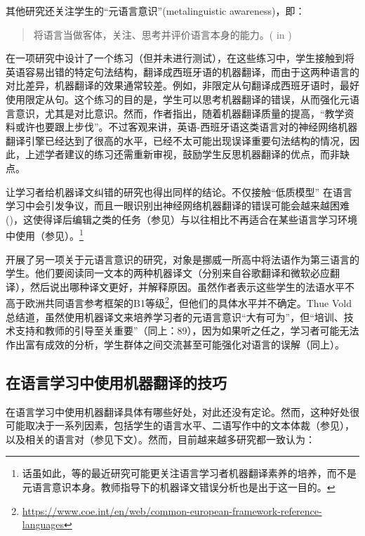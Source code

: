 \documentclass[output=paper,colorlinks,citecolor=brown]{langscibook}
\begin{document}
其他研究还关注学生的“元语言意识”(metalinguistic awareness)，即：

\begin{quote}
 {将语言当做客体，关注、思考并评价语言本身的能力。(\citet[531]{Thomas1988} in \citealt[67]{ThueVold2018})}
\end{quote}

\citet{EnkinMejías-Bikandi2016}在一项研究中设计了一个练习（但并未进行测试），在这些练习中，学生接触到将英语容易出错的特定句法结构，翻译成西班牙语的机器翻译，而由于这两种语言的对比差异，机器翻译的效果通常较差。例如，非限定从句翻译成西班牙语时，最好使用限定从句。这个练习的目的是，学生可以思考机器翻译的错误，从而强化元语言意识，尤其是对比意识。然而，作者指出，随着机器翻译质量的提高，“教学资料或许也要跟上步伐”\citep[145]{EnkinMejías-Bikandi2016}。不过客观来讲，英语-西班牙语这类语言对的神经网络机器翻译引擎已经达到了很高的水平，已经不太可能出现误译重要句法结构的情况，因此，上述学者建议的练习还需重新审视，鼓励学生反思机器翻译的优点，而非缺点。\largerpage

让学习者给机器译文纠错的研究也得出同样的结论。不仅接触“低质模型”\citep{Niño2009} 在语言学习中会引发争议，而且一眼识别出神经网络机器翻译的错误可能会越来越困难(\citealt{CastilhoWay2017, LoockLéchauguette2021})，这使得译后编辑之类的任务（参见）与以往相比不再适合在某些语言学习环境中使用（参见\citealt{ZhangTorres-Hostench2019}）。\footnote{话虽如此，\citet{LoockLéchauguette2021}等的最近研究可能更关注语言学习者机器翻译素养的培养，而不是元语言意识本身。教师指导下的机器译文错误分析也是出于这一目的。} 

\citet{ThueVold2018}开展了另一项关于元语言意识的研究，对象是挪威一所高中将法语作为第三语言的学生。他们要阅读同一文本的两种机器译文（分别来自谷歌翻译和微软必应翻译），然后说出哪种译文更好，并解释原因。虽然作者\citep[73]{ThueVold2018}表示这些学生的法语水平不高于欧洲共同语言参考框架的B1等级\footnote{\url{https://www.coe.int/en/web/common-european-framework-reference-languages}}，但他们的具体水平并不确定。Thue Vold总结道，虽然使用机器译文来培养学习者的元语言意识“大有可为”，但“培训、技术支持和教师的引导至关重要”（同上：89），因为如果听之任之，学习者可能无法作出富有成效的分析，学生群体之间交流甚至可能强化对语言的误解（同上）。

\subsection{在语言学习中使用机器翻译的技巧}\largerpage
在语言学习中使用机器翻译具体有哪些好处，对此还没有定论。然而，这种好处很可能取决于一系列因素，包括学生的语言水平、二语写作中的文本体裁（参见\citealt{ChungAhn2021}），以及相关的语言对（参见下文）。然而，目前越来越多研究都一致认为：
\end{document}
